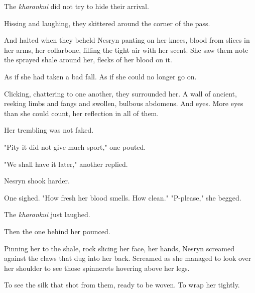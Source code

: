 The \emph{kharankui} did not try to hide their arrival.

Hissing and laughing, they skittered around the corner of the pass.

And halted when they beheld Nesryn panting on her knees, blood from slices in her arms, her collarbone, filling the tight air with her scent.
She saw them note the sprayed shale around her, flecks of her blood on it.

As if she had taken a bad fall.
As if she could no longer go on.

Clicking, chattering to one another, they surrounded her.
A wall of ancient, reeking limbs and fangs and swollen, bulbous abdomens.
And eyes.
More eyes than she could count, her reflection in all of them.

Her trembling was not faked.

"Pity it did not give much sport," one pouted.

"We shall have it later," another replied.

Nesryn shook harder.

One sighed.
"How fresh her blood smells.
How clean."
"P-please," she begged.

The \emph{kharankui} just laughed.

Then the one behind her pounced.

Pinning her to the shale, rock slicing her face, her hands, Nesryn screamed against the claws that dug into her back.
Screamed as she managed to look over her shoulder to see those spinnerets hovering above her legs.

To see the silk that shot from them, ready to be woven.
To wrap her tightly.

